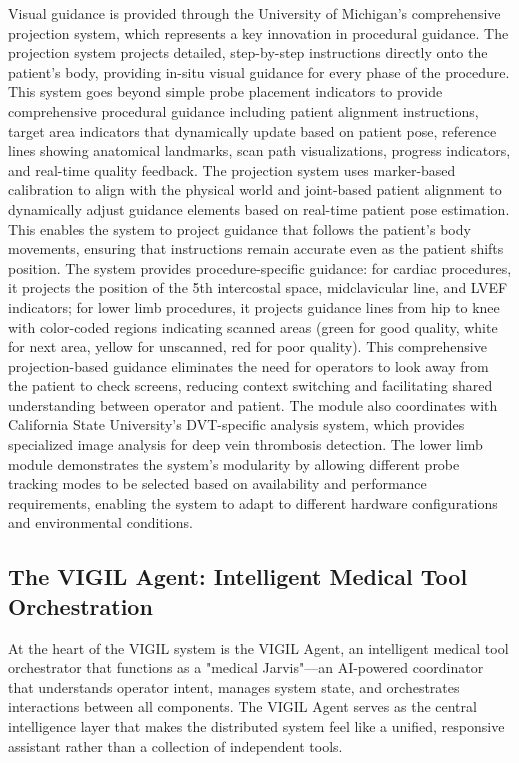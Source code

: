 \documentclass[12pt,a4paper]{article}
\begin{document}
Visual guidance is provided through the University of Michigan's comprehensive projection system, which represents a key innovation in procedural guidance. The projection system projects detailed, step-by-step instructions directly onto the patient's body, providing in-situ visual guidance for every phase of the procedure. This system goes beyond simple probe placement indicators to provide comprehensive procedural guidance including patient alignment instructions, target area indicators that dynamically update based on patient pose, reference lines showing anatomical landmarks, scan path visualizations, progress indicators, and real-time quality feedback. The projection system uses marker-based calibration to align with the physical world and joint-based patient alignment to dynamically adjust guidance elements based on real-time patient pose estimation. This enables the system to project guidance that follows the patient's body movements, ensuring that instructions remain accurate even as the patient shifts position. The system provides procedure-specific guidance: for cardiac procedures, it projects the position of the 5th intercostal space, midclavicular line, and LVEF indicators; for lower limb procedures, it projects guidance lines from hip to knee with color-coded regions indicating scanned areas (green for good quality, white for next area, yellow for unscanned, red for poor quality). This comprehensive projection-based guidance eliminates the need for operators to look away from the patient to check screens, reducing context switching and facilitating shared understanding between operator and patient. The module also coordinates with California State University's DVT-specific analysis system, which provides specialized image analysis for deep vein thrombosis detection. The lower limb module demonstrates the system's modularity by allowing different probe tracking modes to be selected based on availability and performance requirements, enabling the system to adapt to different hardware configurations and environmental conditions.

\subsection{The VIGIL Agent: Intelligent Medical Tool Orchestration}

At the heart of the VIGIL system is the VIGIL Agent, an intelligent medical tool orchestrator that functions as a "medical Jarvis"—an AI-powered coordinator that understands operator intent, manages system state, and orchestrates interactions between all components. The VIGIL Agent serves as the central intelligence layer that makes the distributed system feel like a unified, responsive assistant rather than a collection of independent tools.
\end{document}
